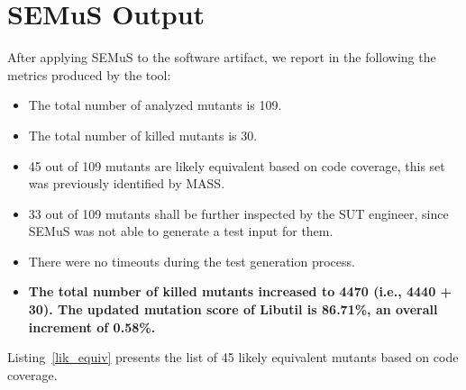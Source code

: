 \section{SEMuS Output}

After applying SEMuS to the software artifact, we report in the following the metrics produced by the tool:

\begin{itemize}
	\item The total number of analyzed mutants is 109.
	\item The total number of killed mutants is 30.
	\item 45 out of 109 mutants are likely equivalent based on code coverage, this set was previously identified by MASS.
	\item 33 out of 109 mutants shall be further inspected by the SUT engineer, since SEMuS was not able to generate a test input for them.
	\item There were no timeouts during the test generation process.
	\item \textbf{The total number of killed mutants increased to 4470 (i.e., 4440 + 30). The updated mutation score of Libutil is 86.71\%, an overall increment of 0.58\%.}
\end{itemize}


Listing~\ref{lik_equiv} presents the list of 45 likely equivalent mutants based on code coverage.

